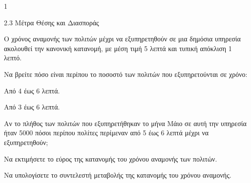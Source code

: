 \begin{ylh}{1}
    \item 2.3 Μέτρα Θέσης και Διασποράς
\end{ylh}
Ο χρόνος αναμονής των πολιτών μέχρι να εξυπηρετηθούν σε μια δημόσια υπηρεσία ακολουθεί την κανονική κατανομή, με μέση τιμή 5 λεπτά και τυπική απόκλιση 1 λεπτό.
\begin{alist}
    \item Να βρείτε πόσο είναι περίπου το ποσοστό των πολιτών που εξυπηρετούνται σε χρόνο:
    \begin{rlist}
        \item Από 4 έως 6 λεπτά.
        \item Από 3 έως 6 λεπτά.
    \end{rlist} 
    \item Αν το πλήθος των πολιτών που εξυπηρετήθηκαν το μήνα Μάιο σε αυτή την υπηρεσία ήταν 5000 πόσοι περίπου πολίτες περίμεναν από 5 έως 6 λεπτά μέχρι να εξυπηρετηθούν; 
    \item Να εκτιμήσετε το εύρος της κατανομής του χρόνου αναμονής των πολιτών. 
    \item Να υπολογίσετε το συντελεστή μεταβολής της κατανομής του χρόνου αναμονής. 
\end{alist}

